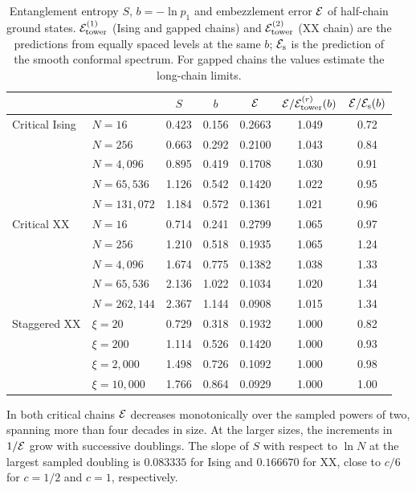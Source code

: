 \begin{table}[t]
\centering\small
\begin{tabular}{@{}llccccc@{}}
\toprule
 & & $S$ & $b$ & $\mathcal{E}$ & $\mathcal{E}/\mathcal{E}_{\mathrm{tower}}^{(r)}(b)$ & $\mathcal{E}/\mathcal{E}_{\mathrm{s}}(b)$\\
\midrule
Critical Ising & $N=16$ & 0.423 & 0.156 & 0.2663 & 1.049 & 0.72 \\
 & $N=256$ & 0.663 & 0.292 & 0.2100 & 1.043 & 0.84 \\
 & $N=4{,}096$ & 0.895 & 0.419 & 0.1708 & 1.030 & 0.91 \\
 & $N=65{,}536$ & 1.126 & 0.542 & 0.1420 & 1.022 & 0.95 \\
 & $N=131{,}072$ & 1.184 & 0.572 & 0.1361 & 1.021 & 0.96 \\
\addlinespace
Critical XX & $N=16$ & 0.714 & 0.241 & 0.2799 & 1.065 & 0.97 \\
 & $N=256$ & 1.210 & 0.518 & 0.1935 & 1.065 & 1.24 \\
 & $N=4{,}096$ & 1.674 & 0.775 & 0.1382 & 1.038 & 1.33 \\
 & $N=65{,}536$ & 2.136 & 1.022 & 0.1034 & 1.020 & 1.34 \\
 & $N=262{,}144$ & 2.367 & 1.144 & 0.0908 & 1.015 & 1.34 \\
\addlinespace
Staggered XX & $\xi=20$ & 0.729 & 0.318 & 0.1932 & 1.000 & 0.82 \\
 & $\xi=200$ & 1.114 & 0.526 & 0.1420 & 1.000 & 0.93 \\
 & $\xi=2{,}000$ & 1.498 & 0.726 & 0.1092 & 1.000 & 0.98 \\
 & $\xi=10{,}000$ & 1.766 & 0.864 & 0.0929 & 1.000 & 1.00 \\
\bottomrule
\end{tabular}
\caption{Entanglement entropy $S$, $b=-\ln p_1$ and embezzlement error $\mathcal{E}$ of half-chain
ground states. $\mathcal{E}_{\mathrm{tower}}^{(1)}$ (Ising and gapped chains) and $\mathcal{E}_{\mathrm{tower}}^{(2)}$ (XX chain) are the predictions from
equally spaced levels at the same $b$; $\mathcal{E}_{\mathrm{s}}$ is the prediction of the smooth
conformal spectrum. For gapped chains the values estimate the long-chain limits.}\label{tab:chains}
\end{table}

In both critical chains $\mathcal{E}$ decreases monotonically over the sampled
powers of two, spanning more than four decades in size. At the larger
sizes, the increments in $1/\mathcal{E}$ grow with successive doublings.
The slope of $S$ with respect to $\ln N$ at the largest sampled
doubling is $0.083335$ for Ising and $0.166670$ for XX, close to $c/6$
for $c=1/2$ and $c=1$, respectively.

